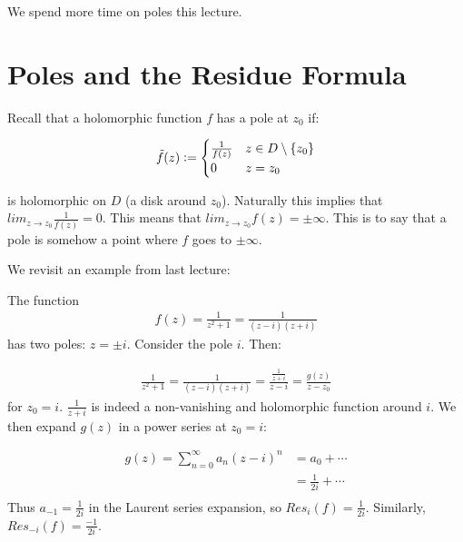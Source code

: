 \setcounter{section}{0}
\setcounter{theorem}{0}



We spend more time on poles this lecture.

\section{Poles and the Residue Formula}

\begin{note}
Recall that a holomorphic function $f$ has a pole at $z_0$ if:

\begin{align*}
    \Tilde{f}(z) \vcentcolon = \begin{cases} \frac{1}{f(z)} & z \in D \setminus \{ z_0 \} \\ 0 & z = z_0  \end{cases}
\end{align*}

is holomorphic on $D$ (a disk around $z_0$). Naturally this implies that $lim_{z \to z_0} \frac{1}{f(z)} = 0$. This means that $lim_{z \to z_0} f(z) = \pm \infty$. This is to say that a pole is somehow a point where $f$ goes to $\pm \infty$.

\end{note}



We revisit an example from last lecture:





\begin{example}
The function
\begin{align*}
f(z) = \frac{1}{z^2+1} = \frac{1}{(z-i)(z+i)}
\end{align*}
has two poles: $z = \pm i$. Consider the pole $i$. Then:

\begin{align*}
    \frac{1}{z^2+1} = \frac{1}{(z-i)(z+i)} = \frac{\frac{1}{z+i}}{z-i} = \frac{g(z)}{z-z_0}
\end{align*}
for $z_0 = i$. $\frac{1}{z+i}$ is indeed a non-vanishing and holomorphic function around $i$. We then expand $g(z)$ in a power series at $z_0 = i$:

\begin{align*}
    g(z) = \sum _{n=0}^\infty a_n (z-i)^n &= a_0 + \cdots\\ &= \frac{1}{2i} + \cdots\\
\end{align*}
Thus $a_{-1} = \frac{1}{2i}$ in the Laurent series expansion, so $Res_i(f) = \frac{1}{2i}$. Similarly, $Res_{-i}(f) = \frac{-1}{2i}$.
\end{example}

